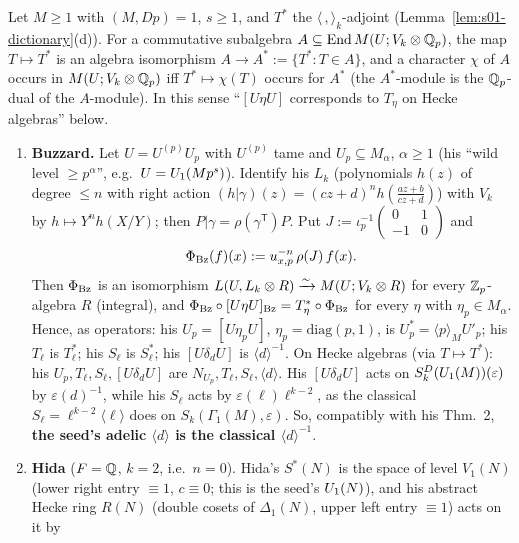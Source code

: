 \begin{lemma}\label{lem:s01-Upconv}
Let $M\ge1$ with $(M,Dp)=1$, $s\ge1$, and $T^*$ the $\langle\,,\rangle_k$-adjoint (Lemma~\ref{lem:s01-dictionary}(d)). For a commutative
subalgebra $A\subseteq\operatorname{End}M(U;V_k\otimes\mathbb{Q}_p)$, the map $T\mapsto T^*$ is an algebra isomorphism $A\to A^*:=\{T^*:T\in A\}$, and a
character $\chi$ of $A$ occurs in $M(U;V_k\otimes\mathbb{Q}_p)$ iff $T^*\mapsto\chi(T)$ occurs for $A^*$ (the $A^*$-module is the $\mathbb{Q}_p$-dual of the
$A$-module). In this sense ``$[U\eta U]$ corresponds to $T_\eta$ on Hecke algebras'' below.
\begin{enumerate}[label=(\alph*)]
\item \textbf{Buzzard.} Let $U=U^{(p)}U_p$ with $U^{(p)}$ tame and $U_p\subseteq M_\alpha$, $\alpha\ge1$ (his ``wild level $\ge p^\alpha$'', e.g.\
  $U=U_1(Mp^s)$). Identify his $L_k$ (polynomials $h(z)$ of degree $\le n$ with right action $(h|\gamma)(z)=(cz+d)^nh(\tfrac{az+b}{cz+d})$)
  with $V_k$ by $h\mapsto Y^nh(X/Y)$; then $P|\gamma=\rho(\gamma^{\mathsf T})P$. Put $J:=\iota_p^{-1}\left(\begin{smallmatrix}0&1\\-1&0\end{smallmatrix}\right)$ and
  \[\Phi_{\rm Bz}(f)(x):=u_{x,p}^{-n}\,\rho(J)\,f(x).\]
  Then $\Phi_{\rm Bz}$ is an isomorphism $L(U,L_k\otimes R)\xrightarrow\sim M(U;V_k\otimes R)$ for every $\mathbb{Z}_p$-algebra $R$ (integral), and
  $\Phi_{\rm Bz}\circ[U\eta U]_{\rm Bz}=T_\eta^*\circ\Phi_{\rm Bz}$ for every $\eta$ with $\eta_p\in M_\alpha$. Hence, as operators:
  his $U_p=[U\eta_pU]$, $\eta_p=\mathrm{diag}(p,1)$, is $U_p^*=\langle p\rangle_MU'_p$; his $T_\ell$ is $T_\ell^*$; his $S_\ell$ is $S_\ell^*$; his $[U\delta_dU]$ is
  $\langle d\rangle^{-1}$. On Hecke algebras (via $T\mapsto T^*$): his $U_p,T_\ell,S_\ell,[U\delta_dU]$ are $N_{U_p},T_\ell,S_\ell,\langle d\rangle$. His
  $[U\delta_dU]$ acts on $S^D_k(U_1(M))(\varepsilon)$ by $\varepsilon(d)^{-1}$, while his $S_\ell$ acts by $\varepsilon(\ell)\ell^{k-2}$, as the classical
  $S_\ell=\ell^{k-2}\langle\ell\rangle$ does on $S_k(\Gamma_1(M),\varepsilon)$. So, compatibly with his Thm.~2, \textbf{the seed's adelic $\langle d\rangle$ is the classical
  $\langle d\rangle^{-1}$}.
\item \textbf{Hida} ($F=\mathbb{Q}$, $k=2$, i.e.\ $n=0$). Hida's $S^*(N)$ is the space of level $V_1(N)$ (lower right entry $\equiv1$, $c\equiv0$; this is the
  seed's $U_1(N)$), and his abstract Hecke ring $R(N)$ (double cosets of $\Delta_1(N)$, upper left entry $\equiv1$) acts on it by

\end{enumerate}
\end{lemma}
